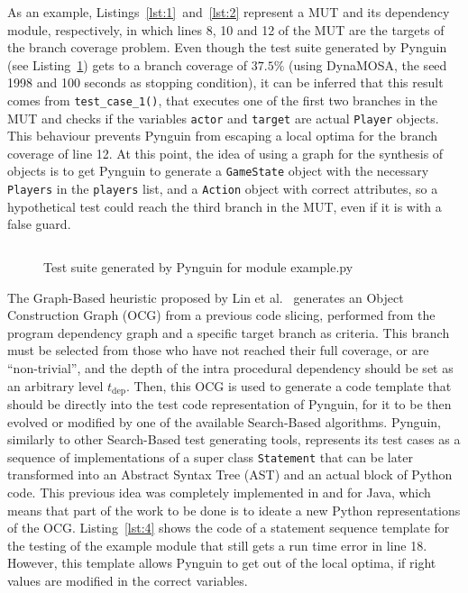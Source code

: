 \documentclass[%
  chapterprefix=false,%
  open=right,%
  twoside=true,%
  paper=a4,%
  logofile={Figures/logo.png},%
  thesistype=master,%
  UKenglish,%
]{se2thesis}
\newcommand{\classname}[1]{\texttt{#1}}
\begin{document}
As an example, Listings~\ref{lst:1}~and~\ref{lst:2} represent a MUT and its dependency module, respectively, in which lines 8, 10 and 12 of the MUT are the targets of the branch coverage problem.
Even though the test suite generated by Pynguin (see Listing~\ref{lst:3}) gets to a branch coverage of \(37.5\%\) (using DynaMOSA, the seed 1998 and 100 seconds as stopping condition), it can be inferred that this result comes from \verb|test_case_1()|, that executes one of the first two branches in the MUT and checks if the variables \verb|actor| and \verb|target| are actual \verb|Player| objects.
This behaviour prevents Pynguin from escaping a local optima for the branch coverage of line 12.
At this point, the idea of using a graph for the synthesis of objects is to get Pynguin to generate a \verb|GameState| object with the necessary \verb|Players| in the \verb|players| list, and a \verb|Action| object with correct attributes, so a hypothetical test could reach the third branch in the MUT, even if it is with a false guard.
  
\begin{figure}
    \inputminted[linenos]{python}{Figures/test1.py}
    \caption{Test suite generated by Pynguin for module example.py\label{lst:3}}
\end{figure}

The Graph-Based heuristic proposed by Lin et al.~\cite{DBLP:conf/sigsoft/0001O00D21} generates an Object Construction Graph (OCG) from a previous code slicing, performed from the program dependency graph and a specific target branch as criteria.
This branch must be selected from those who have not reached their full coverage, or are ``non-trivial'', and the depth of the intra procedural dependency should be set as an arbitrary level $t_{\text{dep}}$.
Then, this OCG is used to generate a code template that should be directly into the test code representation of Pynguin, for it to be then evolved or modified by one of the available Search-Based algorithms.
Pynguin, similarly to other Search-Based test generating tools, represents its test cases as a sequence of implementations of a super class \classname{Statement} that can be later transformed into an Abstract Syntax Tree (AST) and an actual block of Python code.
This previous idea was completely implemented in and for Java, which means that part of the work to be done is to ideate a new Python representations of the OCG.\@
Listing~\ref{lst:4} shows the code of a statement sequence template for the testing of the example module that still gets a run time error in line 18.
However, this template allows Pynguin to get out of the local optima, if right values are modified in the correct variables.
\end{document}
